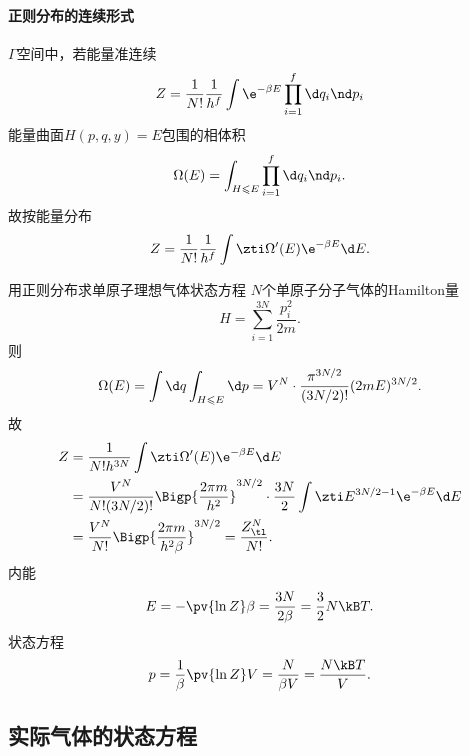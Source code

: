 \paragraph{正则分布的连续形式}$\varGamma$空间中，若能量准连续
\begin{align}
	Z=\frac1{N!}\frac1{h^f}\int\e^{-\beta E}\prod_{i=1}^f\d q_i\nd p_i
\end{align}
能量曲面$H(p,q,y)=E$包围的相体积
\begin{align}
	\Omega(E)=\int_{H\leqslant E}\prod_{i=1}^f\d q_i\nd p_i.
\end{align}
故按能量分布
\begin{align}
	Z=\frac1{N!}\frac1{h^f}\int\zti\Omega'(E)\e^{-\beta E}\d E.
\end{align}
\begin{example}{用正则分布求单原子理想气体状态方程}{}
	$N$个单原子分子气体的Hamilton量
	\[
		H=\sum_{i=1}^{3N}\frac{p_i^2}{2m}.
	\]
	则
	\[
		\Omega(E)=\int\d q\int_{H\leqslant E}\d p=V^N\cdot\frac{\pi^{3N/2}}{(3N/2)!}(2mE)^{3N/2}.
	\]
	故
	\begin{align*}
		Z&=\frac1{N!h^{3N}}\int\zti\Omega'(E)\e^{-\beta E}\d E\\
		&=\frac{V^N}{N!(3N/2)!}\Bigp{\frac{2\pi m}{h^2}}^{3N/2}\cdot\frac{3N}2\int\zti E^{3N/2-1}\e^{-\beta E}\d E\\
		&%
		=\frac{V^N}{N!}\Bigp{\frac{2\pi m}{h^2\beta}}^{3N/2}=\frac{Z_\tl^N}{N!}.
	\end{align*}
	内能
	\begin{align}
		E=-\pv{\ln Z}\beta=\frac{3N}{2\beta}=\frac32N\kB T.
	\end{align}
	状态方程
	\begin{align}
		p=\frac1\beta\pv{\ln Z}V=\frac N{\beta V}=\frac{N\kB T}V.
	\end{align}
\end{example}

\subsection{实际气体的状态方程}

